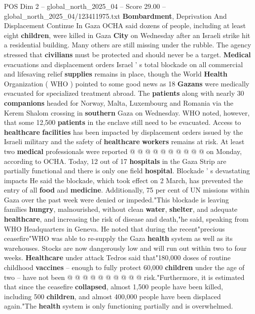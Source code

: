 \begin{textsample}{POS Dim 2 – global\_north\_2025\_04 – Score 29.00 – global\_north\_2025\_04/123411975.txt}  \label{ex:f2_pos_322}
\textbf{Bombardment}, Deprivation And Displacement Continue In Gaza OCHA said dozens of people, including at least eight \textbf{children}, were killed in Gaza \textbf{City} on Wednesday after an Israeli strike hit a residential building.
Many others are still missing under the rubble.
The agency stressed that \textbf{civilians} must be protected and should never be a target. \textbf{Medical} evacuations and displacement orders Israel ' s total blockade on all commercial and lifesaving relief \textbf{supplies} remains in place, though the World \textbf{Health} Organization ( WHO ) pointed to some good news as 18 \textbf{Gazans} were medically evacuated for specialized treatment abroad.
The \textbf{patients} along with nearly 30 \textbf{companions} headed for Norway, Malta, Luxembourg and Romania via the Kerem Shalom crossing in \textbf{southern} Gaza on Wednesday.
WHO noted, however, that some 12,500 \textbf{patients} in the enclave still need to be evacuated.
Access to \textbf{healthcare} \textbf{facilities} has been impacted by displacement orders issued by the Israeli military and the safety of \textbf{healthcare} \textbf{workers} remains at risk.
At least two \textbf{medical} professionals were reported @ @ @ @ @ @ @ @ @ @ on Monday, according to OCHA.
Today, 12 out of 17 \textbf{hospitals} in the Gaza Strip are partially functional and there is only one field \textbf{hospital}.
Blockade ' s devastating impacts He said the blockade, which took effect on 2 March, has prevented the entry of all \textbf{food} and \textbf{medicine}.
Additionally, 75 per cent of UN missions within Gaza over the past week were denied or impeded."This blockade is leaving families \textbf{hungry}, malnourished, without clean \textbf{water}, \textbf{shelter}, and adequate \textbf{healthcare}, and increasing the risk of disease and death,"he said, speaking from WHO Headquarters in Geneva.
He noted that during the recent"precious ceasefire"WHO was able to re-supply the Gaza \textbf{health} system as well as its warehouses.
Stocks are now dangerously low and will run out within two to four weeks. \textbf{Healthcare} under attack Tedros said that"180,000 doses of routine childhood \textbf{vaccines} -- enough to fully protect 60,000 \textbf{children} under the age of two -- have not been @ @ @ @ @ @ @ @ @ @ risk."Furthermore, it is estimated that since the ceasefire \textbf{collapsed}, almost 1,500 people have been killed, including 500 \textbf{children}, and almost 400,000 people have been displaced again."The \textbf{health} system is only functioning partially and is overwhelmed.

\end{textsample}
